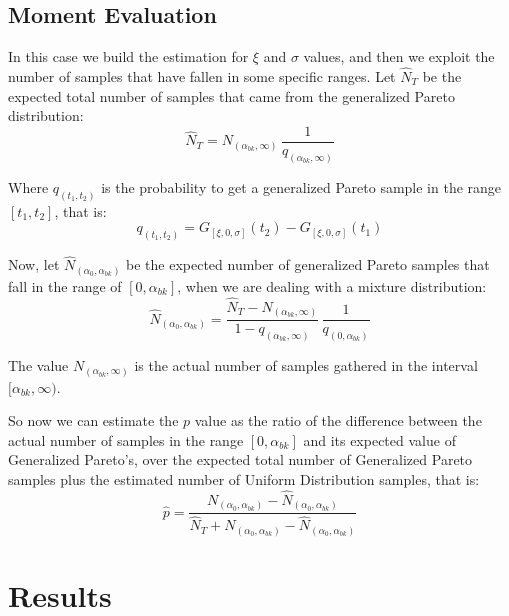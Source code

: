 \subsection{Moment Evaluation} \label{sec:global_mix_moment}

In this case we build the estimation for $\xi$ and $\sigma$ values, and then we exploit the number of samples that have fallen in some specific ranges. Let $\hat{N}_T$ be the expected total number of samples that came from the generalized Pareto distribution:
\begin{equation} \label{eqn:mix_n_t}
  \hat{N}_T = N_{(\alpha_{bk}, \infty)} \, \dfrac{1}{q_{(\alpha_{bk}, \infty)}}
\end{equation}

Where $q_{(t_1, t_2)}$ is the probability to get a generalized Pareto sample in the range $\left[t_1, t_2\right]$, that is:
\begin{equation}
  q_{(t_1, t_2)} = G_{[\xi,0,\sigma]}(t_2) - G_{[\xi,0,\sigma]}(t_1) \label{eqn:mean_eval_prob}
\end{equation}

Now, let $\hat{N}_{(\alpha_{0}, \alpha_{bk})}$ be the expected number of generalized Pareto samples that fall in the range of $[0, \alpha_{bk}]$, when we are dealing with a mixture distribution:
\begin{equation} \label{eqn:mix_n_alpha}
  \hat{N}_{(\alpha_{0}, \alpha_{bk})} = \dfrac{
     \hat{N}_T - N_{(\alpha_{bk}, \infty)}
  }{
    1 - q_{(\alpha_{bk}, \infty)}
  } \, \dfrac{1}{q_{(0, \alpha_{bk})}}
\end{equation}

The value $N_{(\alpha_{bk}, \infty)}$ is the actual number of samples gathered in the interval $[\alpha_{bk}, \infty)$.

So now we can estimate the $p$ value as the ratio of the difference between the actual number of samples in the range $[0, \alpha_{bk}]$ and its expected value of Generalized Pareto's, over the expected total number of Generalized Pareto samples plus the estimated number of Uniform Distribution samples, that is:
\begin{equation}
	\hat{p} =  \dfrac{
		N_{(\alpha_{0}, \alpha_{bk})}  - \hat{N}_{(\alpha_{0}, \alpha_{bk})}
	}{
		\hat{N}_T + N_{(\alpha_{0}, \alpha_{bk})} - \hat{N}_{(\alpha_{0}, \alpha_{bk})} 
	} \label{eqn:p_est}
\end{equation}

\newpage

\section{Results} \label{sec:glob_result}

